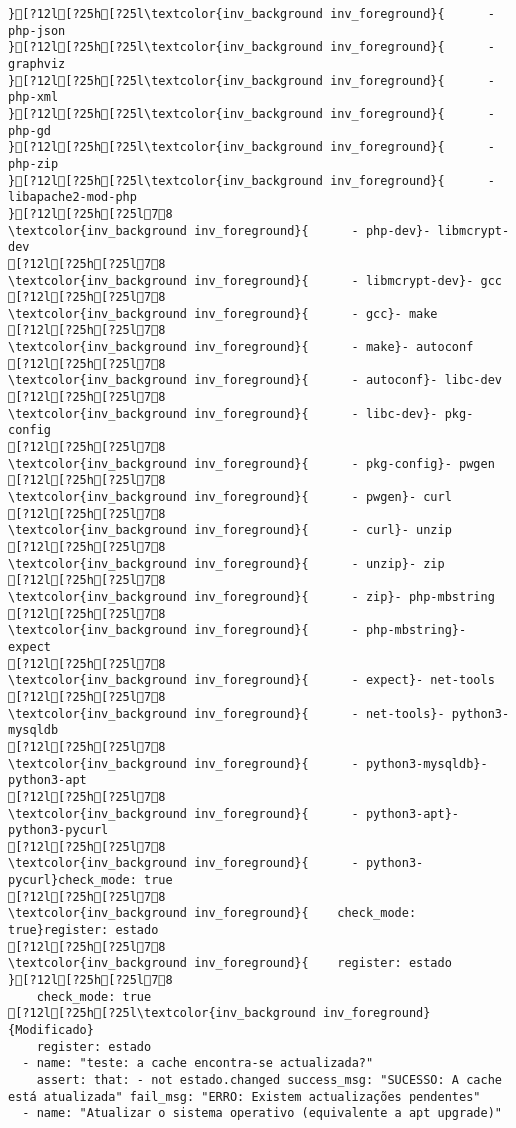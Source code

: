 \documentclass{scrartcl}
\begin{document}
\begin{Verbatim}
}[?12l[?25h[?25l\textcolor{inv_background inv_foreground}{      - php-json
}[?12l[?25h[?25l\textcolor{inv_background inv_foreground}{      - graphviz
}[?12l[?25h[?25l\textcolor{inv_background inv_foreground}{      - php-xml
}[?12l[?25h[?25l\textcolor{inv_background inv_foreground}{      - php-gd
}[?12l[?25h[?25l\textcolor{inv_background inv_foreground}{      - php-zip
}[?12l[?25h[?25l\textcolor{inv_background inv_foreground}{      - libapache2-mod-php
}[?12l[?25h[?25l78
\textcolor{inv_background inv_foreground}{      - php-dev}- libmcrypt-dev
[?12l[?25h[?25l78
\textcolor{inv_background inv_foreground}{      - libmcrypt-dev}- gcc
[?12l[?25h[?25l78
\textcolor{inv_background inv_foreground}{      - gcc}- make
[?12l[?25h[?25l78
\textcolor{inv_background inv_foreground}{      - make}- autoconf
[?12l[?25h[?25l78
\textcolor{inv_background inv_foreground}{      - autoconf}- libc-dev
[?12l[?25h[?25l78
\textcolor{inv_background inv_foreground}{      - libc-dev}- pkg-config
[?12l[?25h[?25l78
\textcolor{inv_background inv_foreground}{      - pkg-config}- pwgen
[?12l[?25h[?25l78
\textcolor{inv_background inv_foreground}{      - pwgen}- curl
[?12l[?25h[?25l78
\textcolor{inv_background inv_foreground}{      - curl}- unzip
[?12l[?25h[?25l78
\textcolor{inv_background inv_foreground}{      - unzip}- zip
[?12l[?25h[?25l78
\textcolor{inv_background inv_foreground}{      - zip}- php-mbstring
[?12l[?25h[?25l78
\textcolor{inv_background inv_foreground}{      - php-mbstring}- expect
[?12l[?25h[?25l78
\textcolor{inv_background inv_foreground}{      - expect}- net-tools
[?12l[?25h[?25l78
\textcolor{inv_background inv_foreground}{      - net-tools}- python3-mysqldb
[?12l[?25h[?25l78
\textcolor{inv_background inv_foreground}{      - python3-mysqldb}- python3-apt
[?12l[?25h[?25l78
\textcolor{inv_background inv_foreground}{      - python3-apt}- python3-pycurl
[?12l[?25h[?25l78
\textcolor{inv_background inv_foreground}{      - python3-pycurl}check_mode: true
[?12l[?25h[?25l78
\textcolor{inv_background inv_foreground}{    check_mode: true}register: estado
[?12l[?25h[?25l78
\textcolor{inv_background inv_foreground}{    register: estado
}[?12l[?25h[?25l78
    check_mode: true
[?12l[?25h[?25l\textcolor{inv_background inv_foreground}{Modificado}
    register: estado
  - name: "teste: a cache encontra-se actualizada?"
    assert: that: - not estado.changed success_msg: "SUCESSO: A cache está atualizada" fail_msg: "ERRO: Existem actualizações pendentes"
  - name: "Atualizar o sistema operativo (equivalente a apt upgrade)"

\end{Verbatim}
\end{document}

